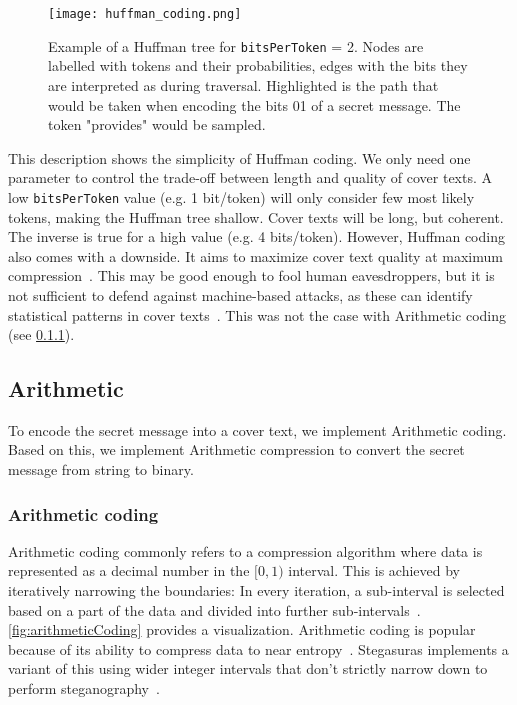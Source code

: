 \begin{figure}
    \begin{wide}
        \centering
        \captionsetup{width=\linewidth}
        \texttt{[image: huffman\_coding.png]}
		\caption[Huffman coding]{Example of a Huffman tree for \lstinline|bitsPerToken| = 2. Nodes are labelled with tokens and their probabilities, edges with the bits they are interpreted as during traversal. Highlighted is the path that would be taken when encoding the bits 01 of a secret message. The token "provides" would be sampled.}
        \label{fig:huffmanCoding}
    \end{wide}
\end{figure}

This description shows the simplicity of Huffman coding. We only need one parameter to control the trade-off between length and quality of cover texts. A low \lstinline|bitsPerToken| value (e.g. 1 bit/token) will only consider few most likely tokens, making the Huffman tree shallow. Cover texts will be long, but coherent. The inverse is true for a high value (e.g. 4 bits/token). However, Huffman coding also comes with a downside. It aims to maximize cover text quality at maximum compression~\cite{zieglerNeuralLinguisticSteganography2019}. This may be good enough to fool human eavesdroppers, but it is not sufficient to defend against machine-based attacks, as these can identify statistical patterns in cover texts~\cite{zieglerNeuralLinguisticSteganography2019}. This was not the case with Arithmetic coding (see \cref{sec:arithmeticCoding}).

\subsection{Arithmetic}
\label{sec:arithmetic}
To encode the secret message into a cover text, we implement Arithmetic coding. Based on this, we implement Arithmetic compression to convert the secret message from string to binary.

\subsubsection{Arithmetic coding}
\label{sec:arithmeticCoding}
Arithmetic coding commonly refers to a compression algorithm where data is represented as a decimal number in the $ [0, 1) $ interval. This is achieved by iteratively narrowing the boundaries: In every iteration, a sub-interval is selected based on a part of the data and divided into further sub-intervals~\cite{rissanenArithmeticCoding1979}. \cref{fig:arithmeticCoding} provides a visualization. Arithmetic coding is popular because of its ability to compress data to near entropy~\cite{rissanenArithmeticCoding1979}. Stegasuras implements a variant of this using wider integer intervals that don't strictly narrow down to perform steganography~\cite{zieglerNeuralLinguisticSteganography2019,rubinArithmeticStreamCoding1979}.

